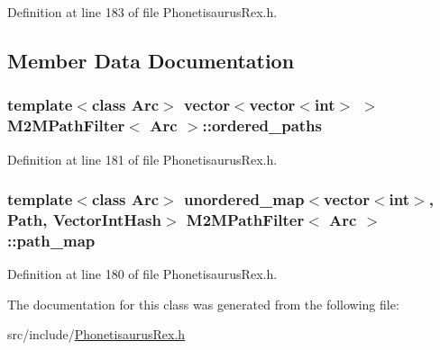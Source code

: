 Definition at line 183 of file Phonetisaurus\+Rex.\+h.



\subsection{Member Data Documentation}
\subsubsection[{ordered\+\_\+paths}]{\setlength{\rightskip}{0pt plus 5cm}template$<$class Arc$>$ vector$<$vector$<$int$>$ $>$ {\bf M2\+M\+Path\+Filter}$<$ Arc $>$\+::ordered\+\_\+paths}\hypertarget{class_m2_m_path_filter_a9aa2add87bbbe3199cc5c89ce804bd27}{}\label{class_m2_m_path_filter_a9aa2add87bbbe3199cc5c89ce804bd27}


Definition at line 181 of file Phonetisaurus\+Rex.\+h.

\subsubsection[{path\+\_\+map}]{\setlength{\rightskip}{0pt plus 5cm}template$<$class Arc$>$ unordered\+\_\+map$<$vector$<$int$>$, {\bf Path}, {\bf Vector\+Int\+Hash}$>$ {\bf M2\+M\+Path\+Filter}$<$ Arc $>$\+::path\+\_\+map}\hypertarget{class_m2_m_path_filter_aafc66538ae046055f483f8b661445145}{}\label{class_m2_m_path_filter_aafc66538ae046055f483f8b661445145}


Definition at line 180 of file Phonetisaurus\+Rex.\+h.



The documentation for this class was generated from the following file\+:\begin{DoxyCompactItemize}
\item 
src/include/\hyperlink{_phonetisaurus_rex_8h}{Phonetisaurus\+Rex.\+h}\end{DoxyCompactItemize}
